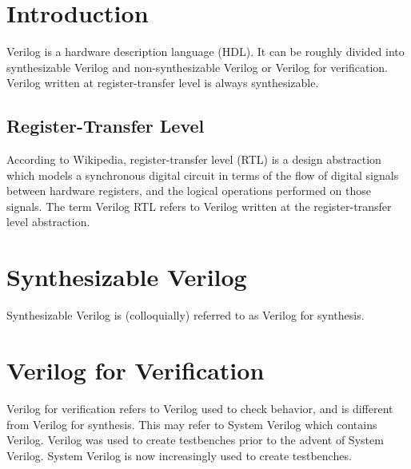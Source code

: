 \documentclass{book}
\begin{document}
\chapter{Introduction}
Verilog is a hardware description language (HDL). It can be roughly divided into synthesizable Verilog and non-synthesizable Verilog or Verilog for verification. Verilog written at register-transfer level is always synthesizable.

\section{Register-Transfer Level}
According to Wikipedia, register-transfer level (RTL) is a design abstraction which models a synchronous digital circuit in terms of the flow of digital signals between hardware registers, and the logical operations performed on those signals.  The term Verilog RTL refers to Verilog written at the register-transfer level abstraction. 

\chapter{Synthesizable Verilog}
Synthesizable Verilog is (colloquially) referred to as Verilog for synthesis.

\chapter{Verilog for Verification}
Verilog for verification refers to Verilog used to check behavior, and is different from Verilog for synthesis. This may refer to System Verilog which contains Verilog. Verilog was used to create testbenches prior to the advent of System Verilog. System Verilog is now increasingly used to create testbenches.
\end{document}
